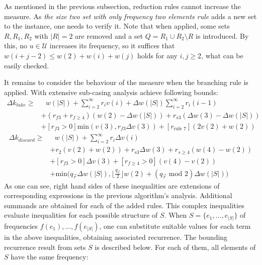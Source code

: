 As mentioned in the previous subsection, reduction rules cannot increase the measure. As \textit{the size two set with only frequency two elements rule} adds a new set to the instance, one needs to verify it. Note that when applied, some sets $R, R_1, R_2$ with $|R| = 2$ are removed and a set $Q = R_1 \cup R_2 \setminus R$ is introduced. By this, no $u\in\mathcal{U}$ increases its frequency, so it suffices that $w(i+j-2) \leq w(2) + w(i) + w(j)$ holds for any $i,j \geq 2$, what can be easily checked.
\par It remains to consider the behaviour of the measure when the branching rule is applied. With extensive sub-casing analysis \citeauthor{VANROOIJ20112147} achieve following bounds:
\begin{equation*}
    \begin{split}
        \Delta k_{take} \geq 
        &\text{ } w(|S|) + \sum_{i = 2}^\infty r_i v(i) + \Delta w(|S|)\sum_{i = 2}^\infty r_i(i - 1) \\
        &+ (r_{f3} + r_{f\geq 4})(w(2) - \Delta w(|S|)) + r_{s3}(\Delta w(3) - \Delta w(|S|)) \\
        &+ [r_{f3} > 0] \text{min}(v(3), r_{f3} \Delta v(3)) + [r_{\text{rule 7}}](2v(2) + w(2))
    \end{split}
\end{equation*}
\begin{equation*}
    \begin{split}
        \Delta k_{discard} \geq
        &\text{ } w(|S|) + \sum_{i = 2}^\infty r_i \Delta v(i) \\
        &+ r_2(v(2) + w(2)) + r_{s3} \Delta w(3) + r_{s\geq 4}(w(4) - w(2))\\
        & + [r_{f3} > 0]\Delta v(3) + [r_{f\geq 4} > 0](v(4) - v(2)) \\
        & + \text{min} \Big(q_{\vec{r}}\Delta w(|S|), \lfloor \frac{q_{\vec{r}}}{2}\rfloor w(2) + (q_{\vec{r}} \text{ mod } 2) \Delta w(|S|)\Big) 
    \end{split}
\end{equation*}
As one can see, right hand sides of these inequalities are extensions of corresponding expressions in the previous algorithm's analysis. Additional summands are obtained for each of the added rules. This complex inequalities evaluate inequalities for each possible structure of $S$. When $S = \{ e_1, \dots, e_{|S|}\}$ of frequencies $f(e_1), \dots, f(e_{|S|})$, one can substitute suitable values for each term in the above inequalities, obtaining associated recurrence. 
The bounding recurrence result from sets $S$ is described below. For each of them, all elements of $S$ have the same frequency: 
